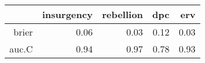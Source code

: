 \begin{tabular}{rrrrr}
  \hline
 & insurgency & rebellion & dpc & erv \\ 
  \hline
brier & 0.06 & 0.03 & 0.12 & 0.03 \\ 
  auc.C & 0.94 & 0.97 & 0.78 & 0.93 \\ 
   \hline
\end{tabular}
